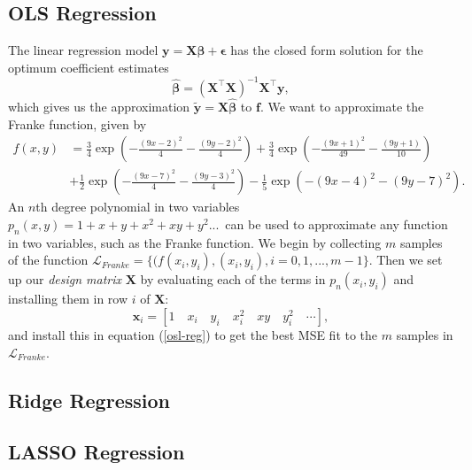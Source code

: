 \documentclass[]{article}
\begin{document}
\subsection{OLS Regression}
The linear regression model $\mathbf{y} = \mathbf{X\beta} + \mathbf{\epsilon}$ has the closed form solution for the optimum coefficient estimates \cite{van2015lecture}
\begin{equation}
\label{osl-reg}
	\mathbf{\hat{\beta}} = (\mathbf{X}^\intercal \mathbf{X})^{-1} \mathbf{X}^\intercal \mathbf{y},
\end{equation}
which gives us the approximation $\mathbf{\tilde{y}} = \mathbf{X\hat{\beta}}$ to $\mathbf{f}$. We want to approximate the Franke function, given by
\begin{equation}
\begin{aligned}
f(x,y) &= \frac{3}{4}\exp{\left(-\frac{(9x-2)^2}{4} - \frac{(9y-2)^2}{4}\right)}+\frac{3}{4}\exp{\left(-\frac{(9x+1)^2}{49}- \frac{(9y+1)}{10}\right)} \\
&+\frac{1}{2}\exp{\left(-\frac{(9x-7)^2}{4} - \frac{(9y-3)^2}{4}\right)} -\frac{1}{5}\exp{\left(-(9x-4)^2 - (9y-7)^2\right) }.
\end{aligned}
\end{equation}
An $n$th degree polynomial in two variables $p_n(x,y) = 1 + x + y + x^2 + xy + y^2 ...$ can be used to approximate any function in two variables, such as the Franke function. We begin by collecting $m$ samples of the function $\mathcal{L}_{Franke} = \{(f(x_i, y_i), (x_i, y_i), i=0,1,...,m-1\}$. Then we set up our \textit{design matrix} $\mathbf{X}$ by evaluating each of the terms in $p_n(x_i,y_i)$ and installing them in row $i$ of $\mathbf{X}$:
\begin{equation}
\mathbf{x}_i = [1 \quad x_i \quad y_i \quad x_i^2 \quad xy \quad y_i^2 \quad \cdots],
\end{equation}
and install this in equation (\ref{osl-reg}) to get the best MSE fit to the $m$ samples in $\mathcal{L}_{Franke}$. 





\subsection{Ridge Regression}


\subsection{LASSO Regression}
\end{document}

